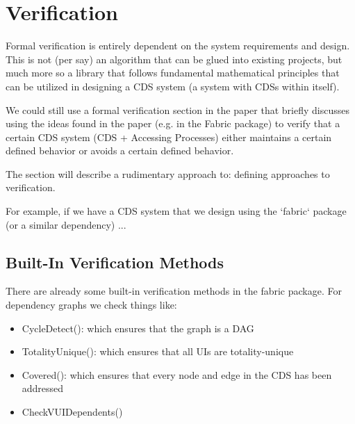 \section{Verification}

Formal verification is entirely dependent on the system requirements and design. This is not (per say) an algorithm that can be glued into existing projects, but much more so a library that follows fundamental mathematical principles that can be utilized in designing a CDS system (a system with CDSs within itself).

We could still use a formal verification section in the paper that briefly discusses using the ideas found in the paper (e.g. in the Fabric package) to verify that a certain CDS system (CDS + Accessing Processes) either maintains a certain defined behavior or avoids a certain defined behavior.

The section will describe a rudimentary approach to: defining approaches to verification.

For example, if we have a CDS system that we design using the `fabric` package (or a similar dependency) ...

\subsection{Built-In Verification Methods}

There are already some built-in verification methods in the fabric package. For dependency graphs we check things like:

\begin{itemize}
	\item CycleDetect(): which ensures that the graph is a DAG
	\item TotalityUnique(): which ensures that all UIs are totality-unique
	\item Covered(): which ensures that every node and edge in the CDS has been addressed
	\item CheckVUIDependents()
\end{itemize}